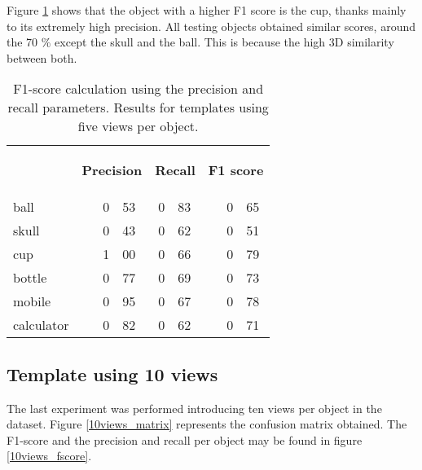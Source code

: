 	Figure \ref{5views_fscore} shows that the object with a higher F1 score is the cup, thanks mainly to its extremely high precision.  
	All testing objects obtained similar scores, around the 70 \% except the skull and the ball. 
	This is because the high 3D similarity between both. 

\begin{table}[H]
\centering
\begin{tabular} {l l r@{.}l r@{.}l l r@{.}l }
\toprule
\addlinespace[3mm]
   \multicolumn{1}{c}{\begin{center}\textbf{Object}\end{center}} &
   \multicolumn{3}{c}{\begin{flushright}\textbf{Precision}\end{flushright}} &
   \multicolumn{2}{c}{\begin{flushright}\textbf{Recall}\end{flushright}} &
   \multicolumn{3}{c}{\begin{flushright}\hspace*{0.2cm}\textbf{F1 score}\end{flushright}} &\\
\addlinespace[-3mm]

\midrule
ball		&&	0&53 	&	0&83	&&	0&65	\\
skull		&&	0&43	&	0&62	&&	0&51	\\
cup			&&	1&00	&	0&66	&&	0&79	\\
bottle		&&	0&77	&	0&69	&&	0&73	\\
mobile		&&	0&95	&	0&67	&&	0&78	\\
calculator	&&	0&82	&	0&62	&&	0&71	\\


\bottomrule
\end{tabular}
\caption[F1-score - templates using 5 views]{F1-score calculation using the precision and recall parameters. Results for templates using five views per object. }
\label{5views_fscore}
\end{table}




\subsection{Template using 10 views}
The last experiment was performed introducing ten views per object in the dataset. 
Figure \ref{10views_matrix} represents the confusion matrix obtained. 
The F1-score and the precision and recall per object may be found in figure \ref{10views_fscore}.

